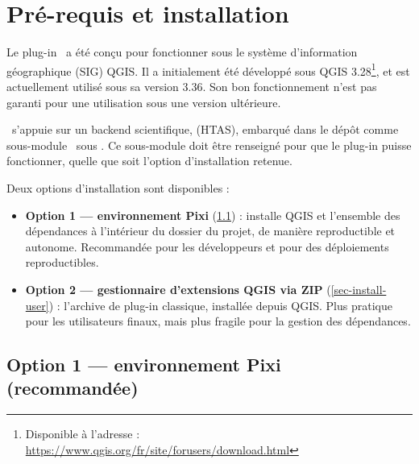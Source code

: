 \chapter{Pré-requis et installation}
\label{chap-setup}

\renewcommand{\headrulewidth}{0.3pt}
\fancyhead[LE]{\thepage}
\fancyhead[RE]{\nouppercase{\textbf{\leftmark}}}
\fancyhead[RO]{\thepage}
\fancyhead[LO]{\nouppercase{\textbf{\rightmark}}}
\fancyfoot[L,C,R]{}

\setlength{\parindent}{0.35cm}

\minitoc
\newpage


Le plug-in \cwv~a été conçu pour fonctionner sous le système d'information géographique (SIG) QGIS. Il a initialement été développé sous QGIS 3.28\footnote{Disponible à l'adresse : \href{https://www.qgis.org/fr/site/forusers/download.html}{https://www.qgis.org/fr/site/forusers/download.html}}, et est actuellement utilisé sous sa version 3.36. Son bon fonctionnement n'est pas garanti pour une utilisation sous une version ultérieure.

\cwv~s'appuie sur un backend scientifique,  (HTAS), embarqué dans le dépôt comme sous-module \gitlab~sous . Ce sous-module doit être renseigné pour que le plug-in puisse fonctionner, quelle que soit l'option d'installation retenue.

Deux options d'installation sont disponibles :
\begin{itemize}
    \item \textbf{Option 1 --- environnement Pixi} (\cref{sec-install-pixi}) : installe QGIS et l'ensemble des dépendances à l'intérieur du dossier du projet, de manière reproductible et autonome. Recommandée pour les développeurs et pour des déploiements reproductibles.
    \item \textbf{Option 2 --- gestionnaire d'extensions QGIS via ZIP} (\cref{sec-install-user}) : l'archive de plug-in classique, installée depuis QGIS. Plus pratique pour les utilisateurs finaux, mais plus fragile pour la gestion des dépendances.
\end{itemize}

\section{Option 1 --- environnement Pixi (recommandée)} \label{sec-install-pixi}

